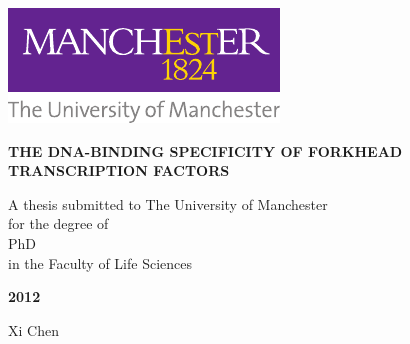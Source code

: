 \documentclass[12pt,a4paper]{report}
\begin{document}
\begin{titlepage}
\includegraphics{uom_logo.pdf}

\vspace{100pt}
\begin{center}
    \Large \textbf{THE DNA-BINDING SPECIFICITY OF FORKHEAD TRANSCRIPTION FACTORS}\par
    
    \normalsize
    \vspace{50pt}
    A thesis submitted to The University of Manchester\\[7.5pt]
    for the degree of\\[7.5pt]
    PhD\\[7.5pt]
    in the Faculty of Life Sciences
    
    \vspace{50pt}
    \bf 2012
    
    \vspace{50pt}
    Xi Chen
\end{center}
\end{titlepage}
\setcounter{page}{2}

\setlength{\parskip}{12pt}

\tableofcontents
\clearpage

\uomlot

\uomlof
\end{document}

